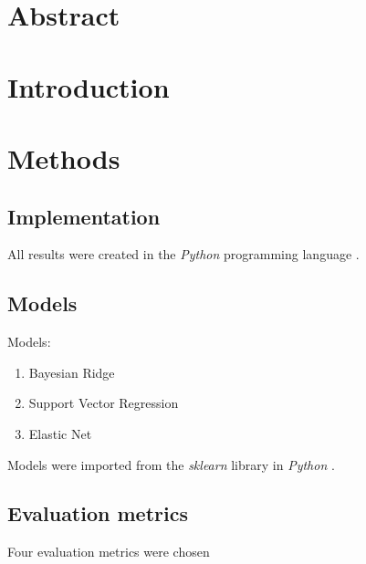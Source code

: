 \documentclass[12pt, a4paper]{article}
\begin{document}
\begin{multicols}{2}
    \section*{Abstract} \label{sec:abs}

    \section{Introduction} \label{sec:intro}

    \section{Methods} \label{sec:methods}

    \subsection{Implementation} \label{subsec:impl}

    All results were created in the \textit{Python} programming language \cite{noauthor_3132_nodate}.
    \newline

    \subsection{Models} \label{subsec:models}

    Models:
    \newline

    \begin{enumerate} \label{enm:models}
        \item Bayesian Ridge
        \item Support Vector Regression
        \item Elastic Net
    \end{enumerate}

    Models were imported from the \textit{sklearn} \cite{noauthor_scikit-learn_nodate} library in \textit{Python} \cite{noauthor_3132_nodate}.
    \newline

    \subsection{Evaluation metrics} \label{subsec:metrics}

    Four evaluation metrics were chosen
    \newline


\end{multicols}
\end{document}
